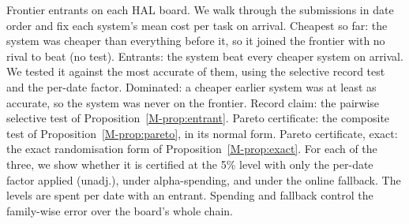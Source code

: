 \documentclass[10pt]{article}
\begin{document}
\begin{table}[h]
\centering\small
\resizebox{\textwidth}{!}{}
\caption{Frontier entrants on each HAL board. We walk through the submissions in date order and fix each system's mean cost per task on arrival. Cheapest so far: the system was cheaper than everything before it, so it joined the frontier with no rival to beat (no test). Entrants: the system beat every cheaper system on arrival. We tested it against the most accurate of them, using the selective record test and the per-date factor. Dominated: a cheaper earlier system was at least as accurate, so the system was never on the frontier. Record claim: the pairwise selective test of Proposition~\ref{M-prop:entrant}. Pareto certificate: the composite test of Proposition~\ref{M-prop:pareto}, in its normal form. Pareto certificate, exact: the exact randomisation form of Proposition~\ref{M-prop:exact}. For each of the three, we show whether it is certified at the 5\% level with only the per-date factor applied (unadj.), under alpha-spending, and under the online fallback. The levels are spent per date with an entrant. Spending and fallback control the family-wise error over the board's whole chain.}
\label{tab:certify}
\end{table}
\end{document}
